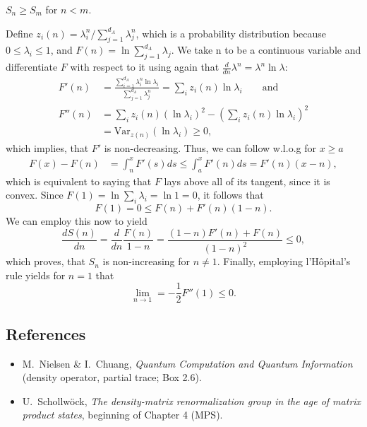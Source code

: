 \documentclass[../../main.tex]{subfiles}
\begin{document}
\begin{claim}
      $S_n \geq S_m$ for $n<m$.
\end{claim}
\begin{claimproof}
      Define $z_i(n) = \lambda_i^n / \sum_{j=1}^{d_A} \lambda_j^n$, which is a probability distribution because $0 \leq \lambda_i \leq 1$, and $F(n) = \ln \sum_{j=1}^{d_A} \lambda_j$. We take n to be a continuous variable and differentiate $F$ with respect to it using again that $\frac{d}{dn} \lambda^n = \lambda^n \ln \lambda $:
      \begin{align*}
            F'(n) &= \frac{\sum_{i=1}^{d_A} \lambda_i^n \ln \lambda_i }{\sum_{j=1}^{d_A} \lambda_j^n} 
            = \sum_i z_i(n) \ln \lambda_i \qquad \text{and} \\
            F''(n) &= \sum_i z_i(n) (\ln \lambda_i)^2 - \left( \sum_i z_i(n) \ln \lambda_i \right)^2 \\
            &= \mathrm{Var}_{z(n)}(\ln \lambda_i) \geq 0 ,
      \end{align*}
      which implies, that $F'$ is non-decreasing. Thus, we can follow w.l.o.g for $x\geq a$
      \begin{align*}
            F(x) - F(n) &= \int_n^x F'(s) ds \leq \int_a^x F'(n) ds = F'(n) (x - n),
      \end{align*}
      which is equivalent to saying that $F$ lays above all of its tangent, since it is convex. Since $F(1) = \ln \sum_i \lambda_i = \ln 1 = 0 $, it follows that
      \begin{equation*}
            F(1) = 0 \leq F(n) + F'(n)(1-n) .
      \end{equation*}
      We can employ this now to yield 
      \begin{equation*}
            \frac{d S(n)}{dn} = \frac{d}{dn} \frac{F(n)}{1-n} = \frac{(1-n) F'(n) + F(n)}{(1-n)^2} \leq 0 ,
      \end{equation*}  
      which proves, that $S_n$ is non-increasing for $n \neq 1$.
      Finally, employing l'Hôpital's rule yields for $n=1$ that
      \begin{equation*}
            \lim_{n\rightarrow1} = - \frac{1}{2} F''(1) \leq 0 .
      \end{equation*}
\end{claimproof}




\subsection{References}
\begin{itemize}
\item M.\ Nielsen \& I.\ Chuang, \emph{Quantum Computation and Quantum Information}
      (density operator, partial trace; Box 2.6).
\item U.\ Schollw\"ock, \emph{The density-matrix renormalization group in the age of matrix
      product states}, beginning of Chapter 4 (MPS).
\end{itemize}
\end{document}
